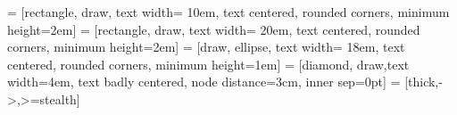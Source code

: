 \usepackage{nameref} %
\usepackage{tikz} %
\usetikzlibrary{arrows,calc,positioning,shapes}
 = [rectangle, draw, 
text width= 10em, text centered, rounded corners, minimum height=2em] %
 = [rectangle, draw, 
text width= 20em, text centered, rounded corners, minimum height=2em] %
 = [draw, ellipse, text width= 18em, text centered, rounded corners, minimum height=1em] %
 = [diamond, draw,text width=4em, text badly centered, node distance=3cm, inner sep=0pt] %
 = [thick,->,>=stealth]
\usepackage{float} %
\usepackage{listings} %
\usepackage{amsmath} %
\usepackage{booktabs} %
